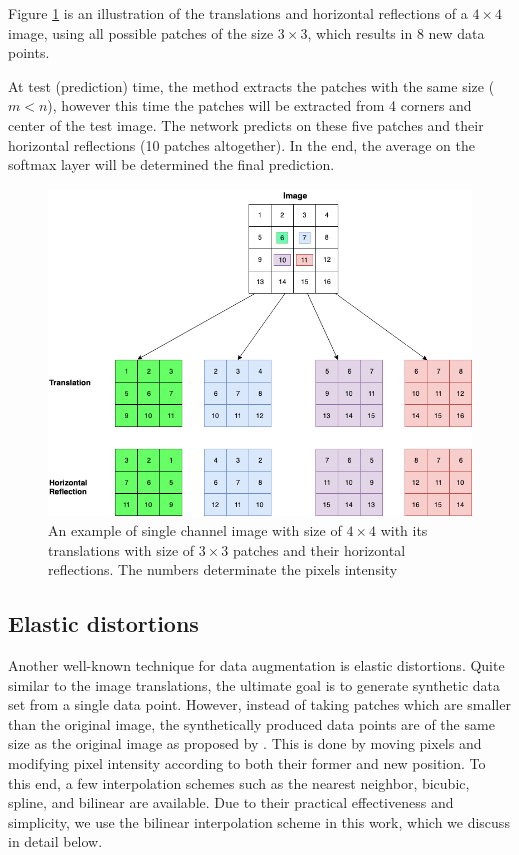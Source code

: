 Figure \ref{fig:label-preserving-trasformation} is an illustration of the translations and horizontal
reflections of a $4 \times 4$ image, using all
possible patches of the size $3 \times 3$, which results in $8$ new data points.

At test (prediction) time, the method extracts the patches with the same size ($m < n$), however this time the
patches will be extracted from 4 corners and center of the test image. The network predicts on these
five patches and their horizontal reflections (10 patches altogether). In the end, the average
on the softmax layer will be determined the final prediction.

\begin{figure}
  \centering
  \label{fig:label-preserving-trasformation}
  \includegraphics[width=1\textwidth]{fig/label-preserving-transformation}
  \caption{An example of single channel image with size of $4\times4$ with its translations with size of $3\times3$ patches and their horizontal reflections. The numbers determinate the pixels intensity}
\end{figure}


\subsection{Elastic distortions}
\label{tit:elastic-distrotion}
Another well-known technique for data augmentation is elastic distortions. Quite similar to the image
translations, the ultimate goal is to generate synthetic data set from a single data point. However, instead of
taking patches which are smaller than the original image, the synthetically produced data points are
of the same size as the original image as proposed by \cite{elastic_distortion_paper} . This is done by moving pixels and modifying pixel intensity
according to both their former and new position.  To this end, a few interpolation schemes such as
the nearest neighbor, bicubic, spline, and bilinear are available. Due to their practical
effectiveness and simplicity, we use the bilinear interpolation scheme in this work, which we
discuss in detail below.

